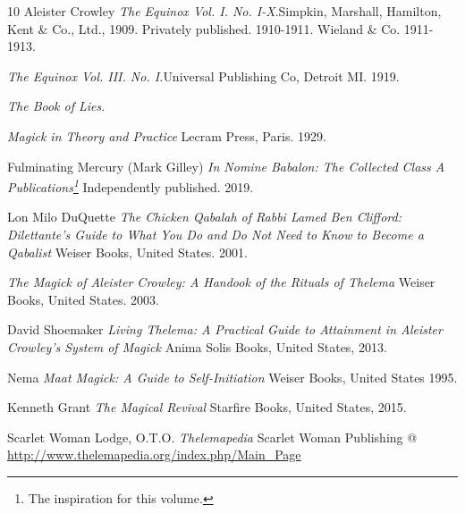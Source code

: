 \makeatletter
\renewcommand\@biblabel[1]{}
\makeatother
\renewcommand{\bibname}{Bibliography \& Additional Resources}
\begin{thebibliography}{10}
  Aleister Crowley
  \textit{The Equinox Vol. I. No. I-X}.\footnotemark[1]
  Simpkin, Marshall, Hamilton, Kent \& Co., Ltd., 1909.
  Privately published. 1910-1911.
  Wieland \& Co. 1911-1913.

  \textemdash{}
  \textit{The Equinox Vol. III. No. I.}\footnotemark[\value{footnote}]
  Universal Publishing Co, Detroit MI. 1919.

  \textemdash{}
  \textit{The Book of Lies}.

  \textemdash{}
  \textit{Magick in Theory and Practice}\footnotemark[\value{footnote}]
  Lecram Press, Paris. 1929.

  Fulminating Mercury (Mark Gilley)
  \textit{In Nomine Babalon: The Collected Class A Publications\footnote{The inspiration for this volume.}}
  Independently published. 2019.

  Lon Milo DuQuette
  \textit{The Chicken Qabalah of Rabbi Lamed Ben Clifford: Dilettante's Guide to What You Do and Do Not Need to Know to Become a Qabalist}
  Weiser Books, United States. 2001.

  \textemdash{}
  \textit{The Magick of Aleister Crowley: A Handook of the Rituals of Thelema}
  Weiser Books, United States. 2003.

  David Shoemaker
  \textit{Living Thelema: A Practical Guide to Attainment in Aleister Crowley's System of Magick}
  Anima Solis Books, United States, 2013.

  Nema
  \textit{Maat Magick: A Guide to Self-Initiation}
  Weiser Books, United States 1995.

  Kenneth Grant
  \textit{The Magical Revival}
  Starfire Books, United States, 2015.

  Scarlet Woman Lodge, O.T.O.
  \textit{Thelemapedia}
  Scarlet Woman Publishing
  @ \url{http://www.thelemapedia.org/index.php/Main_Page}
\end{thebibliography}
